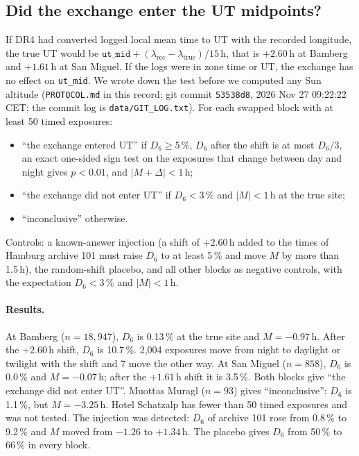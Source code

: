\documentclass[11pt]{article}
\begin{document}
\subsection{Did the exchange enter the UT midpoints?}
If DR4 had converted logged local mean time to UT with the recorded longitude, the true UT would be $\texttt{ut\_mid} + (\lambda_\mathrm{rec}-\lambda_\mathrm{true})/15$\,h, that is $+2.60$\,h at Bamberg and $+1.61$\,h at San Miguel. If the logs were in zone time or UT, the exchange has no effect on \texttt{ut\_mid}. We wrote down the test before we computed any Sun altitude (\texttt{PROTOCOL.md} in this record; git commit \texttt{53538d8}, 2026 Nov 27 09:22:22 CET; the commit log is \texttt{data/GIT\_LOG.txt}). For each swapped block with at least 50 timed exposures:
\begin{itemize}
\item ``the exchange entered UT'' if $D_6\ge5\,\%$, $D_6$ after the shift is at most $D_6/3$, an exact one-sided sign test on the exposures that change between day and night gives $p<0.01$, and $|M+\Delta|<1$\,h;
\item ``the exchange did not enter UT'' if $D_6<3\,\%$ and $|M|<1$\,h at the true site;
\item ``inconclusive'' otherwise.
\end{itemize}
Controls: a known-answer injection (a shift of $+2.60$\,h added to the times of Hamburg archive 101 must raise $D_6$ to at least 5\,\% and move $M$ by more than 1.5\,h), the random-shift placebo, and all other blocks as negative controls, with the expectation $D_6<3\,\%$ and $|M|<1$\,h.

\paragraph{Results.} At Bamberg ($n=18{,}947$), $D_6$ is 0.13\,\% at the true site and $M=-0.97$\,h. After the $+2.60$\,h shift, $D_6$ is 10.7\,\%. 2{,}004 exposures move from night to daylight or twilight with the shift and 7 move the other way. At San Miguel ($n=858$), $D_6$ is 0.0\,\% and $M=-0.07$\,h; after the $+1.61$\,h shift it is 3.5\,\%. Both blocks give ``the exchange did not enter UT''. Muottas Muragl ($n=93$) gives ``inconclusive'': $D_6$ is 1.1\,\%, but $M=-3.25$\,h. Hotel Schatzalp has fewer than 50 timed exposures and was not tested. The injection was detected: $D_6$ of archive 101 rose from 0.8\,\% to 9.2\,\% and $M$ moved from $-1.26$ to $+1.34$\,h. The placebo gives $D_6$ from 50\,\% to 66\,\% in every block.
\end{document}
